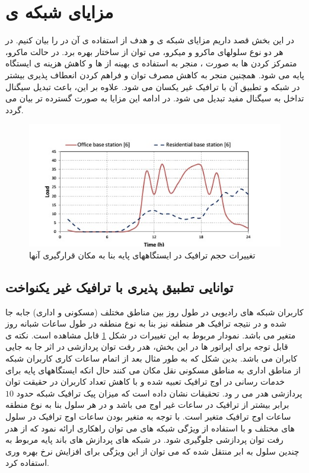 \section{مزایای شبکه ی }

در این بخش قصد داریم مزایای شبکه ی  و هدف از استفاده ی آن در  را بیان کنیم.
\newline
در هر دو نوع سلولهای ماکرو و میکرو، می توان از ساختار  بهره برد. در حالت ماکرو، متمرکز کردن  ها به صورت ، منجر به استفاده ی بهینه از  ها و کاهش هزینه ی ایستگاه پایه  می شود. همچنین منجر به کاهش مصرف توان و فراهم کردن انعطاف پذیری بیشتر در شبکه و تطبیق آن با ترافیک غیر یکسان می شود. علاوه بر این، باعث تبدیل سیگنال تداخل به سیگنال مفید تبدیل می شود. در ادامه این مزایا به صورت گسترده تر بیان می گردد. \cite{checko2015cloud, namba2012colony}
\begin{figure}
  \centering
    \includegraphics[width=\textwidth]{./pic1/c4}
  \caption{تغییرات حجم ترافیک در ایستگاههای پایه بنا به
مکان قرارگیری آنها \cite{checko2015cloud}}
  \label{fig:c4}
\end{figure}
\subsection{توانایی تطبیق پذیری با ترافیک غیر
یکنواخت }
کاربران شبکه های رادیویی در طول روز بین مناطق مختلف
(مسکونی و اداری) جابه جا شده و در نتیجه ترافیک هر
منطقه نیز بنا به نوع منطقه در طول ساعات شبانه روز متغیر
می باشد.
نمودار مربوط به این تغییرات در شکل \ref{fig:c4} قابل
مشاهده است. نکته ی قابل توجه برای اپراتور ها در این
بخش، هدر رفت توان پردازشی در اثر جا به جایی کابران می
باشد. بدین شکل که به طور مثال بعد از اتمام ساعات کاری
کاربران شبکه از مناطق اداری به مناطق مسکونی نقل مکان
می کنند حال انکه ایستگاههای پایه برای خدمات رسانی
در اوج ترافیک تعبیه شده و با کاهش تعداد کاربران در
حقیقت توان پردازشی هدر می ر ود. تحقیقات نشان داده
است که میزان پیک ترافیک شبکه حدود  $10$ برابر بیشتر
از ترافیک در ساعات غیر اوج می باشد و در هر سلول بنا
به نوع منطقه ساعات اوج ترافیک متغیر است. با توجه به
متغیر بودن ساعات اوج ترافیک در سلول های مختلف و
با استفاده از ویژگی شبکه های  می توان راهکاری
ارائه نمود که از هدر رفت توان پردازشی جلوگیری شود.
در شبکه های  پردازش های باند پایه مربوط به
چندین سلول به ابر منتقل شده که می توان از این ویژگی
برای افزایش نرخ بهره وری استفاده کرد.  \cite{checko2015cloud, namba2012colony} 
